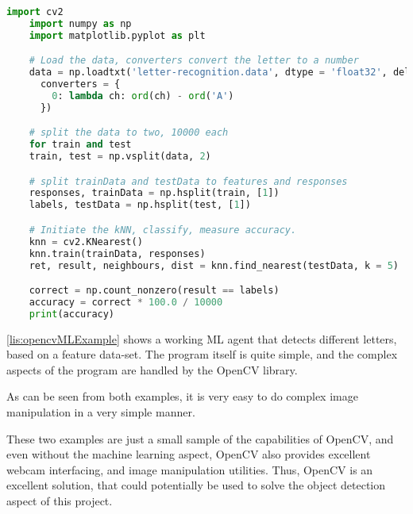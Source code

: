 \begin{lstlisting}[language=Python,label=lis:opencvMLExample,caption=Source code OpenCV documentation\cite{opencvMLexamples}.]
	import cv2
	import numpy as np
	import matplotlib.pyplot as plt

	# Load the data, converters convert the letter to a number
	data = np.loadtxt('letter-recognition.data', dtype = 'float32', delimiter = ',',
	  converters = {
	    0: lambda ch: ord(ch) - ord('A')
	  })

	# split the data to two, 10000 each
	for train and test
	train, test = np.vsplit(data, 2)

	# split trainData and testData to features and responses
	responses, trainData = np.hsplit(train, [1])
	labels, testData = np.hsplit(test, [1])

	# Initiate the kNN, classify, measure accuracy.
	knn = cv2.KNearest()
	knn.train(trainData, responses)
	ret, result, neighbours, dist = knn.find_nearest(testData, k = 5)

	correct = np.count_nonzero(result == labels)
	accuracy = correct * 100.0 / 10000
	print(accuracy)
\end{lstlisting}

\autoref{lis:opencvMLExample} shows a working ML agent that detects different letters, based on a feature data-set.
The program itself is quite simple, and the complex aspects of the program are handled by the OpenCV library.

As can be seen from both examples, it is very easy to do complex image manipulation in a very simple manner.

These two examples are just a small sample of the capabilities of OpenCV, and even without the machine learning aspect, OpenCV also provides excellent webcam interfacing, and image manipulation utilities.
Thus, OpenCV is an excellent solution, that could potentially be used to solve the object detection aspect of this project.


